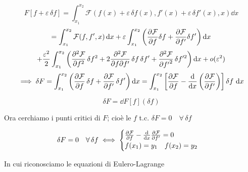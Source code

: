 \begin{equation}
    F\left[ f + \varepsilon \, \delta f \right] 
    = \int_{x_1}^{x_2} \mathcal{F}\left( f(x) + \varepsilon \, \delta f(x), f'(x) + \varepsilon \, \delta f'(x), x \right) \dd{x}
\end{equation}
\begin{equation*}
    = \int_{x_1}^{x_2} \mathcal{F}(f, f', x) \dd{x} 
    + \varepsilon \int_{x_1}^{x_2} \left( \pdv{\mathcal{F}}{f} \delta f + \pdv{\mathcal{F}}{f'} \delta f' \right) \dd{x}
\end{equation*}
\begin{equation}
    + \frac{\varepsilon^2}{2} \int_{x_1}^{x_2} \left( 
    \pdv[2]{\mathcal{F}}{f} \, \delta f^2 
    + 2 \pdv{\mathcal{F}}{f}{f'} \, \delta f \, \delta f' 
    + \pdv[2]{\mathcal{F}}{{f'}} \, \delta f'^2 
    \right) \dd{x} + o(\varepsilon^2)
\end{equation}
\begin{equation}
    \implies \delta F = \int_{x_1}^{x_2} \left( \pdv{\mathcal{F}}{f} \, \delta f + \pdv{\mathcal{F}}{f'} \, \delta f' \right) \dd{x} 
    = \int_{x_1}^{x_2} \left[ \pdv{\mathcal{F}}{f} - \dv{x} \left( \pdv{\mathcal{F}}{f'} \right) \right] \delta f \, \dd{x}
\end{equation}

\begin{remark}
    \begin{equation*}
    \delta F = \dd{F}[f](\delta f)
    \end{equation*}    
\end{remark}

Ora cerchiamo i punti critici di $F$; cioè le $f$ t.c. $\delta F = 0 \quad \forall \, \delta f$

\begin{proposition}
    \begin{equation}
        \delta F = 0 \quad \forall\,\delta f \iff \begin{cases}
            \pdv{\mathcal{F}}{f} - \dv{x} \pdv{\mathcal{F}}{f'}=0 \\
            f(x_1)=y_1 \quad f(x_2)= y_2
        \end{cases}
    \end{equation}
\end{proposition}
In cui riconosciamo le equazioni di Eulero-Lagrange

